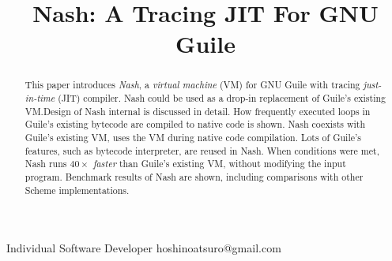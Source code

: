 \documentclass[preprint, 10pt]{sigplanconf}
\begin{document}
\setlength{\pdfpageheight}{\paperheight}
\setlength{\pdfpagewidth}{\paperwidth}




\title{Nash: A Tracing JIT For GNU Guile}

           {Individual Software Developer}
           {hoshinoatsuro@gmail.com}

\maketitle

\begin{abstract}

This paper introduces \textit{Nash}, a \textit{virtual machine} (VM) for GNU
Guile with tracing \textit{just-in-time} (JIT) compiler. Nash could be used as a
drop-in replacement of Guile's existing VM.\@ Design of Nash internal is
discussed in detail. How frequently executed loops in Guile's existing bytecode
are compiled to native code is shown. Nash coexists with Guile's existing VM,
uses the VM during native code compilation. Lots of Guile's features, such as
bytecode interpreter, are reused in Nash. When conditions were met, Nash runs
\textit{$40\times$ faster} than Guile's existing VM, without modifying the input
program. Benchmark results of Nash are shown, including comparisons with other
Scheme implementations.




\end{abstract}

\end{document}
